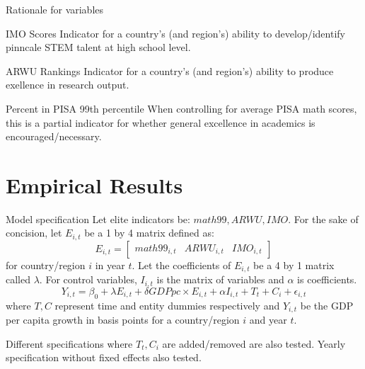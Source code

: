 \documentclass[10pt]{beamer}
\begin{document}
\begin{frame}{Rationale for variables}
    \begin{block}{IMO Scores}
        Indicator for a country's (and region's) ability to develop/identify pinncale STEM talent at high school level.
    \end{block}

    \begin{block}{ARWU Rankings}
        Indicator for a country's (and region's) ability to produce exellence in research output.
    \end{block}

    \begin{block}{Percent in PISA 99th percentile}
        When controlling for average PISA math scores, this is a partial indicator for whether general excellence in academics is encouraged/necessary.
    \end{block}
\end{frame}

\section{Empirical Results}
\begin{frame}{Model specification}
    Let elite indicators be: $math99, ARWU, IMO$.
    For the sake of concision, let $E_{i,t}$ be a 1 by 4 matrix defined as:
    \[E_{i,t} = 
    \begin{bmatrix}
        math99_{i, t} & ARWU_{i, t} & IMO_{i, t}
    \end{bmatrix}
    \] for country/region $i$ in year $t$.
    Let the coefficients of $E_{i, t}$ be a 4 by 1 matrix called $\lambda$. For control variables, $I_{i, t}$ is the matrix of variables and $\alpha$ is coefficients.
    \begin{equation}
        Y_{i, t} = \beta_0 + \lambda E_{i, t} + \delta GDPpc \times E_{i,t} + \alpha I_{i, t} + T_t + C_i + \epsilon_{i, t}
    \end{equation}
    where $T,C$ represent time and entity dummies respectively and $Y_{i,t}$ be the GDP per capita growth in basis points for a country/region $i$ and year $t$.
    
    Different specifications where $T_t, C_i$ are added/removed are also tested. Yearly specification without fixed effects also tested.
\end{frame}
\end{document}
